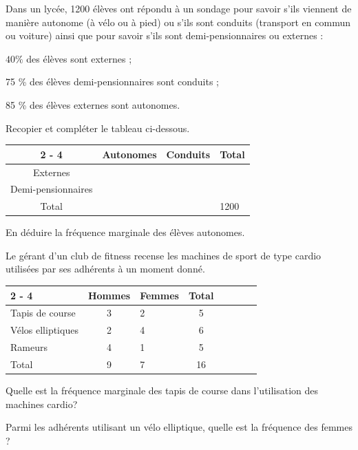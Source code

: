 \documentclass[11pt,a4paper]{book}
\begin{document}
Dans un lycée, 1200 élèves ont répondu à un sondage pour savoir s'ils viennent de manière autonome (à vélo ou à pied) ou s'ils sont conduits (transport en commun ou voiture) ainsi que pour savoir s'ils sont demi-pensionnaires ou externes :
\begin{itemMet}
	\item $40 \%$ des élèves sont externes ;
	\item 75 \% des élèves demi-pensionnaires sont conduits ;
	\item 85 \% des élèves externes sont autonomes.
\end{itemMet}
\begin{enumMet}
	\item Recopier et compléter le tableau ci-dessous.
	
\begin{tabular}{|c|l|l|l|}
	\cline { 2 - 4 } \multicolumn{1}{c|}{} & Autonomes & Conduits & Total \\
	\hline Externes & & & \\
	\hline Demi-pensionnaires & & & \\
	\hline Total & & & 1200 \\
	\hline
\end{tabular}
	\item En déduire la fréquence marginale des élèves autonomes.
\end{enumMet}


Le gérant d'un club de fitness recense les machines de sport de type cardio utilisées par ses adhérents à un moment donné.

\begin{tabular}{|Xc|Xc|Xc|Xc|}
	\cline { 2 - 4 } \multicolumn{1}{c|}{} & Hommes & Femmes & Total \\
	\hline Tapis de course & 3 & 2 & 5 \\
	\hline Vélos elliptiques & 2 & 4 & 6 \\
	\hline Rameurs & 4 & 1 & 5 \\
	\hline Total & 9 & 7 & 16 \\
	\hline
\end{tabular}

\begin{enumMet}
	\item Quelle est la fréquence marginale des tapis de course dans l'utilisation des machines cardio?
	\item Parmi les adhérents utilisant un vélo elliptique, quelle est la fréquence des femmes ?
\end{enumMet}
\end{document}
